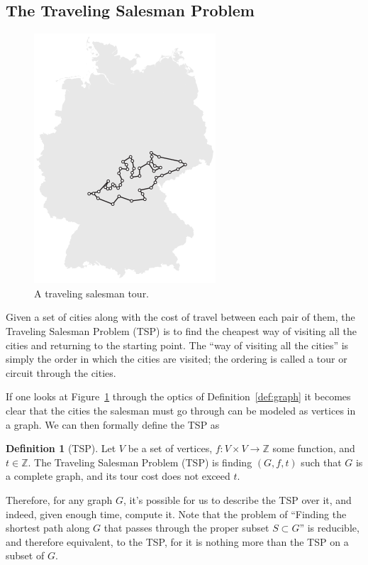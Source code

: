 \documentclass[11pt,letterpaper]{article}
\theoremstyle{definition}
\newtheorem{defn}{Definition}[section]
\begin{document}
\subsection{The Traveling Salesman Problem}\label{sub:tsp}
\begin{figure}
	\centering
	\includegraphics{./TSP.png}
	\caption{A traveling salesman tour.\protect\footnotemark[21]}\label{fig:TSP}
\end{figure}
Given a set of cities along with the cost of travel between each pair of them, the Traveling Salesman Problem (TSP) is to find the cheapest way of visiting all the cities and returning to the starting point. The ``way of visiting all the cities'' is simply the order in which the cities are visited; the ordering is called a tour or circuit through the cities.\autocite{applegate_2007}

If one looks at Figure~\ref{fig:TSP} through the optics of Definition~\ref{def:graph} it becomes clear that the cities the salesman must go through can be modeled as vertices in a graph. We can then formally define the TSP as

\begin{defn}[TSP]\label{def:TSP}
	Let \(V\) be a set of vertices, \(f\colon V\times V \to \mathbb Z\) some function, and \(t\in \mathbb Z\). The Traveling Salesman Problem (TSP) is finding \((G, f, t)\) such that \(G\) is a complete graph, and its tour cost does not exceed \(t\).
\end{defn}

Therefore, for any graph \(G\), it's possible for us to describe the TSP over it, and indeed, given enough time, compute it. Note that the problem of ``Finding the shortest path along \(G\) that passes through the proper subset \(S\subset G\)'' is reducible, and therefore equivalent, to the TSP, for it is nothing more than the TSP on a subset of \(G\).
\end{document}
